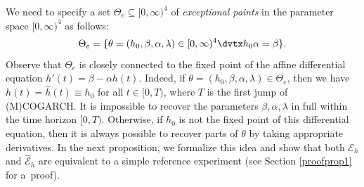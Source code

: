 \documentclass[number,citesort,seceqn,dvips]{arxbj}
\newcommand{\EEE}{{\mathcal E}}
\begin{document}
We need to specify a set $\Theta_{e}\subseteq[0,\infty)^4$ of {\em
exceptional points} in the parameter space $[0,\infty)^4$ as follows:
%
\begin{equation}\label{defThetae}
\Theta_{e} = \{\theta=(h_0,\beta,\alpha,\lambda)\in[0,\infty
)^4\dvtx h_0\alpha=\beta\} .
\end{equation}
%
Observe that $\Theta_e$ is closely connected to the fixed point of the
affine differential equation $h'(t)=\beta-\alpha h(t)$. Indeed, if
$\theta=(h_0,\beta,\alpha,\lambda)\in\Theta_{e}$, then we have
$h(t)=\hat h(t)\equiv h_0$ for all $t\in[0,T)$, where $T$ is the
first jump of (M)COGARCH. It is impossible to recover the parameters
$\beta,\alpha,\lambda$ in full within the time horizon $[0,T)$.
Otherwise, if $h_0$ is not the fixed point of this differential equation,
then it is always possible to recover parts of $\theta$ by taking
appropriate derivatives. In the next proposition, we formalize this
idea and show that both $\EEE_h$ and $\widehat\EEE_h$ are equivalent
to a simple reference experiment (see Section \ref{proofprop1} for a~proof).
\end{document}
